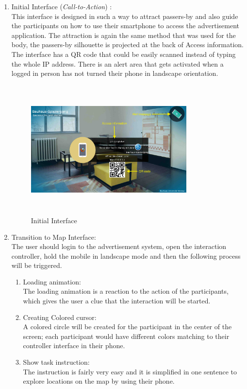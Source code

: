 \begin{enumerate}

\item Initial Interface (\emph{Call-to-Action}) : \\
This interface is designed in such a way to attract passers-by and also guide the participants on how to use their smartphone to access the advertisement application. The attraction is again the same method that was used for the body, the passers-by silhouette is projected at the back of Access information. The interface has a QR code that could be easily scanned instead of typing the whole IP address. There is an alert area that gets activated when a logged in person has not turned their phone in landscape orientation.
\begin{figure}[H]
    \centering
    \includegraphics[width=0.8\textwidth,height=70mm]{Figures/7/mobile_interactive/first_interface}
    \caption{Initial Interface}%
    \label{fig:mobile_firstinterface}%
\end{figure}



\item Transition to Map Interface: \\
The user should login to the advertisement system, open the interaction controller, hold the mobile in landscape mode and then the following process will be triggered. 

\begin{enumerate}
\item Loading animation:\\
The loading animation is a reaction to the action of the participants, which gives the user a clue that the interaction will be started. 
\item  Creating Colored cursor: \\
A colored circle will be created for the participant in the center of the screen; each participant would have different colors matching to their controller interface in their phone.
\item Show task instruction:  \\
The instruction is fairly very easy and it is simplified in one sentence to explore locations on the map by using their phone.


\end{enumerate}
\end{enumerate}
